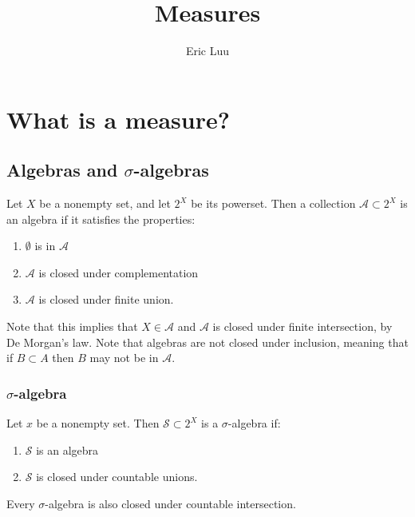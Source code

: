 \documentclass{article}
\title{Measures}
\author{Eric Luu}
\theoremstyle{definition}
\numberwithin{theorem}{section}
\numberwithin{equation}{section}
\newcommand{\alg}{\mathcal{A}}
\newcommand{\sig}{\mathcal{S}}
\begin{document}
\maketitle
\section{What is a measure?}

\subsection{Algebras and $\sigma$-algebras}
Let $X$ be a nonempty set, and let $2^X$ be its powerset. Then a collection $\alg \subset 2^X$ is an algebra if it satisfies the properties:

\begin{enumerate}
	\item $\emptyset$ is in $\alg$
	\item $\alg$ is closed under complementation
	\item $\alg$ is closed under finite union.
\end{enumerate}
Note that this implies that $X \in \alg$ and $\alg$ is closed under finite intersection, by De Morgan's law. Note that algebras are not closed under inclusion, meaning that if $B \subset A$ then $B$ may not be in $\alg$.

\subsubsection{$\sigma$-algebra}
Let $x$ be a nonempty set. Then $\sig \subset 2^X$ is a $\sigma$-algebra if:
\begin{enumerate}
	\item $\sig$ is an algebra
	\item $\sig$ is closed under countable unions. 
\end{enumerate}
Every $\sigma$-algebra is also closed under countable intersection. 
\end{document}
